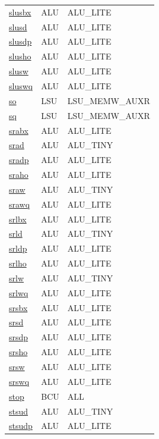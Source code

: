 \begin{small}
\begin{longtable}[l]{l l l}
\hyperlink{lvx.slusbx}{slusbx} & ALU & ALU\_LITE \\ 
\hyperlink{lvx.slusd}{slusd} & ALU & ALU\_LITE \\ 
\hyperlink{lvx.slusdp}{slusdp} & ALU & ALU\_LITE \\ 
\hyperlink{lvx.slusho}{slusho} & ALU & ALU\_LITE \\ 
\hyperlink{lvx.slusw}{slusw} & ALU & ALU\_LITE \\ 
\hyperlink{lvx.sluswq}{sluswq} & ALU & ALU\_LITE \\ 
\hyperlink{lvx.so}{so} & LSU & LSU\_MEMW\_AUXR \\ 
\hyperlink{lvx.sq}{sq} & LSU & LSU\_MEMW\_AUXR \\ 
\hyperlink{lvx.srabx}{srabx} & ALU & ALU\_LITE \\ 
\hyperlink{lvx.srad}{srad} & ALU & ALU\_TINY \\ 
\hyperlink{lvx.sradp}{sradp} & ALU & ALU\_LITE \\ 
\hyperlink{lvx.sraho}{sraho} & ALU & ALU\_LITE \\ 
\hyperlink{lvx.sraw}{sraw} & ALU & ALU\_TINY \\ 
\hyperlink{lvx.srawq}{srawq} & ALU & ALU\_LITE \\ 
\hyperlink{lvx.srlbx}{srlbx} & ALU & ALU\_LITE \\ 
\hyperlink{lvx.srld}{srld} & ALU & ALU\_TINY \\ 
\hyperlink{lvx.srldp}{srldp} & ALU & ALU\_LITE \\ 
\hyperlink{lvx.srlho}{srlho} & ALU & ALU\_LITE \\ 
\hyperlink{lvx.srlw}{srlw} & ALU & ALU\_TINY \\ 
\hyperlink{lvx.srlwq}{srlwq} & ALU & ALU\_LITE \\ 
\hyperlink{lvx.srsbx}{srsbx} & ALU & ALU\_LITE \\ 
\hyperlink{lvx.srsd}{srsd} & ALU & ALU\_LITE \\ 
\hyperlink{lvx.srsdp}{srsdp} & ALU & ALU\_LITE \\ 
\hyperlink{lvx.srsho}{srsho} & ALU & ALU\_LITE \\ 
\hyperlink{lvx.srsw}{srsw} & ALU & ALU\_LITE \\ 
\hyperlink{lvx.srswq}{srswq} & ALU & ALU\_LITE \\ 
\hyperlink{lvx.stop}{stop} & BCU & ALL \\ 
\hyperlink{lvx.stsud}{stsud} & ALU & ALU\_TINY \\ 
\hyperlink{lvx.stsudp}{stsudp} & ALU & ALU\_LITE \\ 

\end{longtable}
\end{small}
